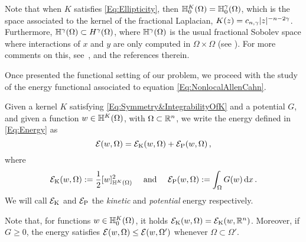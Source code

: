 Note that when $K$ satisfies \eqref{Eq:Ellipticity}, then $\mathbb{H}^K_0 (\Omega) = \mathbb{H}^\gamma_0 (\Omega)$,
which is the space associated to the kernel of the fractional Laplacian, $K(z) = c_{n,\gamma} |z|^{-n-2\gamma}$.
Furthermore, $\mathbb{H}^\gamma(\Omega) \subset H^\gamma(\Omega)$, where $\mathbb{H}^\gamma(\Omega)$ is the usual fractional Sobolev space where interactions of $x$ and $y$ are only computed in $\Omega \times \Omega$ (see \cite{HitchhikerGuide}).  For more comments on this, see~\cite{CozziPassalacqua}, and the references therein.

Once presented the functional setting of our problem, we proceed with the study of the energy functional associated to equation \eqref{Eq:NonlocalAllenCahn}. 


Given a kernel $K$ satisfying \eqref{Eq:Symmetry&IntegrabilityOfK} and a potential $G$, and given a function $w\in \mathbb{H}^K(\Omega)$, with $\Omega\subset \mathbb{R}^{n}$, we write the energy defined in \eqref{Eq:Energy} as
$$
\mathcal{E}(w, \Omega) = \mathcal{E}_\mathrm{K}(w,\Omega) + \mathcal{E}_\mathrm{P}(w,\Omega)\,,
$$
where
$$
\mathcal{E}_\mathrm{K}(w, \Omega) := \dfrac{1}{2} [w]^2_{\mathbb{H}^K(\Omega)} \quad \text{ and } \quad  \mathcal{E}_\mathrm{P}(w, \Omega) := \int_{\Omega} G(w) \,\mathrm{d} x
\,.
$$
We will call $\mathcal{E}_\mathrm{K}$ and $\mathcal{E}_\mathrm{P}$ the \emph{kinetic} and \emph{potential} energy respectively.


Note that, for functions $w\in \mathbb{H}^K_0(\Omega)$, it holds $\mathcal{E}_\mathrm{K}(w,\Omega) = \mathcal{E}_\mathrm{K}(w,\mathbb{R}^n)$. Moreover, if $G\geq 0$, the energy satisfies $\mathcal{E}(w, \Omega) \leq \mathcal{E}(w, \Omega')$  whenever $ \Omega \subset \Omega'$.

